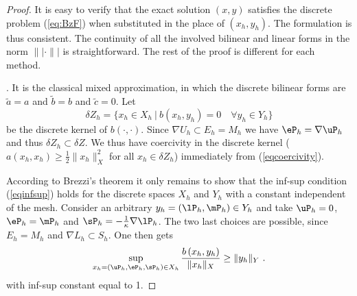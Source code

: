 \begin{proof}
	It is easy to verify that the exact solution $(x,y)$ satisfies the discrete problem (\ref{eq:BzF}) when substituted in the place of $(x_h,y_h)$. The formulation is thus consistent. The continuity of all the involved bilinear and linear forms in the norm $\||\cdot\||$ is straightforward. The rest of the proof is different for each method.
	
	\bigskip
	
 . It is the classical mixed approximation, in which the discrete bilinear forms are $\tilde{a}=a$ and $\tilde{b}=b$ and $\tilde{c}=0$. Let
  $$
 \delta Z_h=\{ x_h\in X_h ~|~b(x_h,y_h)=0\quad \forall y_h\in Y_h \}
 $$
be the discrete kernel of $b(\cdot,\cdot)$. Since $\nabla U_h\subset E_h=M_h$ we have $\eP_h = \nabla \uP_h$ and thus $\delta Z_h \subset \delta Z$. We thus have coercivity in the discrete kernel ($a(x_h,x_h) \geq \frac12 \|x_h\|_X^2$ for all $x_h \in \delta Z_h$) immediately from (\ref{eqcoercivity}). 

According to Brezzi's theorem \cite{Demkowicz2006} it only remains to show that the inf-sup condition (\ref{eqinfsup}) holds for the discrete spaces $X_h$ and $Y_h$ with a constant independent of the mesh. Consider an arbitrary $y_h = \left ( \lP_h, \mP_h \right )\in Y_h$ and take $\uP_h=0$, $\eP_h=\mP_h$ and $\sP_h = -\frac{1}{\kappa} \nabla \lP_h$. The two last choices are possible, since $E_h=M_h$ and $\nabla L_h \subset S_h$. One then gets
 \begin{equation}
 \sup_{x_h=(\uP_h,\eP_h,\sP_h)\in X_h} \frac{b\left (x_h,y_h\right )}{\|x_h\|_X} \geq \|y_h\|_Y~.
 \label{eqsupb}
 \end{equation}
 with inf-sup constant equal to 1.
 
 \bigskip
 

\end{proof}
